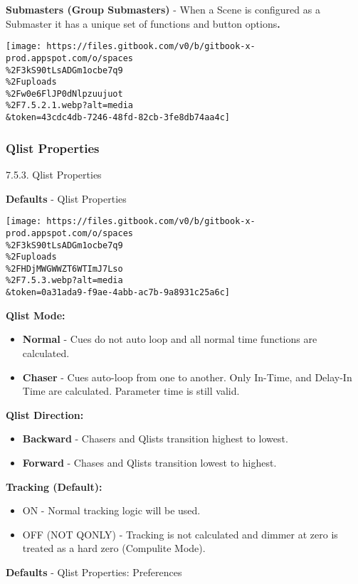 \documentclass[
]{article}
\begin{document}
\textbf{Submasters (Group Submasters)} - When a Scene is configured as a Submaster it has a unique set of functions and button options\textbf{.}

\texttt{[image: https://files.gitbook.com/v0/b/gitbook-x-prod.appspot.com/o/spaces\\\%2F3kS90tLsADGm1ocbe7q9\\\%2Fuploads\\\%2Fw0e6FlJP0dNlpzuujuot\\\%2F7.5.2.1.webp?alt=media\\\&token=43cdc4db-7246-48fd-82cb-3fe8db74aa4c]}

\hypertarget{qlist-properties}{%
\subsubsection{Qlist Properties}\label{qlist-properties}}

7.5.3. Qlist Properties

\textbf{Defaults} - Qlist Properties

\texttt{[image: https://files.gitbook.com/v0/b/gitbook-x-prod.appspot.com/o/spaces\\\%2F3kS90tLsADGm1ocbe7q9\\\%2Fuploads\\\%2FHDjMWGWWZT6WTImJ7Lso\\\%2F7.5.3.webp?alt=media\\\&token=0a31ada9-f9ae-4abb-ac7b-9a8931c25a6c]}

\textbf{Qlist Mode:}

\begin{itemize}
\item
  \textbf{Normal} - Cues do not auto loop and all normal time functions are calculated.
\item
  \textbf{Chaser} - Cues auto-loop from one to another. Only In-Time, and Delay-In Time are calculated. Parameter time is still valid.
\end{itemize}

\textbf{Qlist Direction:}

\begin{itemize}
\item
  \textbf{Backward} - Chasers and Qlists transition highest to lowest.
\item
  \textbf{Forward} - Chases and Qlists transition lowest to highest.
\end{itemize}

\textbf{Tracking (Default):}

\begin{itemize}
\item
  ON - Normal tracking logic will be used.
\item
  OFF {(NOT QONLY)} - Tracking is not calculated and dimmer at zero is treated as a hard zero (Compulite Mode).
\end{itemize}

\textbf{Defaults} - Qlist Properties: Preferences
\end{document}
